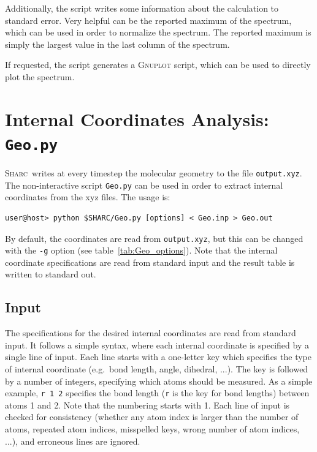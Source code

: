 \documentclass[a4paper,11pt,DIV=15,openany,twoside=false]{scrbook}
\newcommand{\sharc}{\textsc{Sharc}}
\newcommand{\ttt}[1]{\texttt{#1}}
\begin{document}
Additionally, the script writes some information about the calculation to standard error. Very helpful can be the reported maximum of the spectrum, which can be used in order to normalize the spectrum. The reported maximum is simply the largest value in the last column of the spectrum. 

If requested, the script generates a \textsc{Gnuplot} script, which can be used to directly plot the spectrum. 














\section{Internal Coordinates Analysis: \ttt{Geo.py}}\label{sec:Geo.py}

\sharc\ writes at every timestep the molecular geometry to the file \ttt{output.xyz}. The non-interactive script \ttt{Geo.py} can be used in order to extract internal coordinates from the xyz files. The usage is:
\begin{verbatim}
user@host> python $SHARC/Geo.py [options] < Geo.inp > Geo.out
\end{verbatim}
By default, the coordinates are read from \ttt{output.xyz}, but this can be changed with the \ttt{-g} option (see table~\ref{tab:Geo_options}). Note that the internal coordinate specifications are read from standard input and the result table is written to standard out. 

\subsection{Input}

The specifications for the desired internal coordinates are read from standard input. It follows a simple syntax, where each internal coordinate is specified by a single line of input. Each line starts with a one-letter key which specifies the type of internal coordinate (e.g.\ bond length, angle, dihedral, ...). The key is followed by a number of integers, specifying which atoms should be measured. As a simple example, \ttt{r 1 2} specifies the bond length (\ttt{r} is the key for bond lengths) between atoms 1 and 2. Note that the numbering starts with 1. Each line of input is checked for consistency (whether any atom index is larger than the number of atoms, repeated atom indices, misspelled keys, wrong number of atom indices, ...), and erroneous lines are ignored.
\end{document}
